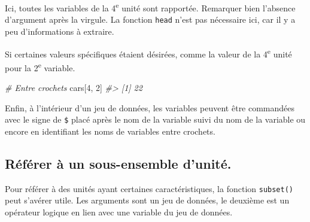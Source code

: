 \documentclass[
]{book}
\newenvironment{Shaded}{}{}
\newcommand{\CommentTok}[1]{\textit{#1}}
\newcommand{\DecValTok}[1]{#1}
\newcommand{\FunctionTok}[1]{#1}
\newcommand{\NormalTok}[1]{#1}
\newcommand{\SpecialCharTok}[1]{#1}
\newcommand{\StringTok}[1]{#1}
\begin{document}
Ici, toutes les variables de la 4\textsuperscript{e} unité sont rapportée. Remarquer bien l'absence d'argument après la virgule. La fonction \texttt{head} n'est pas nécessaire ici, car il y a peu d'informations à extraire.

Si certaines valeurs spécifiques étaient désirées, comme la valeur de la 4\textsuperscript{e} unité pour la 2\textsuperscript{e} variable.

\begin{Shaded}
\begin{Highlighting}[]
\CommentTok{\# Entre crochets}
\NormalTok{cars[}\DecValTok{4}\NormalTok{, }\DecValTok{2}\NormalTok{]}
\CommentTok{\#\textgreater{} [1] 22}
\end{Highlighting}
\end{Shaded}

Enfin, à l'intérieur d'un jeu de données, les variables peuvent être commandées avec le signe de \texttt{\$} placé après le nom de la variable suivi du nom de la variable ou encore en identifiant les noms de variables entre crochets.

\begin{Shaded}
\end{Shaded}

\hypertarget{ruxe9fuxe9rer-uxe0-un-sous-ensemble-dunituxe9.}{%
\subsection{Référer à un sous-ensemble d'unité.}\label{ruxe9fuxe9rer-uxe0-un-sous-ensemble-dunituxe9.}}

Pour référer à des unités ayant certaines caractéristiques, la fonction \texttt{subset()} peut s'avérer utile. Les arguments sont un jeu de données, le deuxième est un opérateur logique en lien avec une variable du jeu de données.
\end{document}
